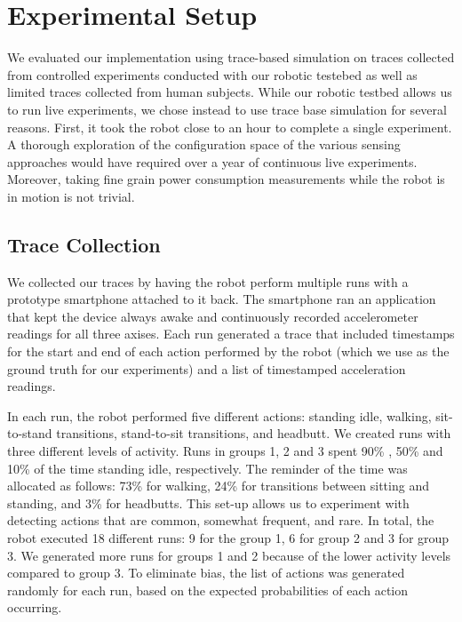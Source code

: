 \section{Experimental Setup}
\label{sec:experimentalSetup}

We evaluated our implementation using trace-based simulation on traces
collected from controlled experiments conducted with our robotic
testebed as well as limited traces collected from human subjects.
While our robotic testbed allows us to run live experiments, we chose
instead to use trace base simulation for several reasons.  First, it
took the robot close to an hour to complete a single experiment.  A
thorough exploration of the configuration space of the various sensing
approaches would have required over a year of continuous live
experiments.  Moreover, taking fine grain power consumption
measurements while the robot is in motion is not trivial.

\subsection{Trace Collection}

We collected our traces by having the robot perform multiple runs with
a prototype smartphone attached to it back.  The smartphone ran an
application that kept the device always awake and continuously recorded
accelerometer readings for all three axises.  Each run generated a
trace that included timestamps for the start and end of each action
performed by the robot (which we use as the ground truth for our
experiments) and a list of timestamped acceleration readings.

In each run, the robot performed five different actions: standing
idle, walking, sit-to-stand transitions, stand-to-sit transitions, and
headbutt.  We created runs with three different levels of activity.
Runs in groups 1, 2 and 3 spent 90\% , 50\% and 10\% of the time
standing idle, respectively. The reminder of the time was allocated as
follows: 73\% for walking, 24\% for transitions between sitting and
standing, and 3\% for headbutts.  This set-up allows us to experiment
with detecting actions that are common, somewhat frequent, and rare.
In total, the robot executed 18 different runs: 9 for the group 1, 6
for group 2 and 3 for group 3.  We generated more runs for groups 1
and 2 because of the lower activity levels compared to group 3. To
eliminate bias, the list of actions was generated randomly for each
run, based on the expected probabilities of each action occurring.

